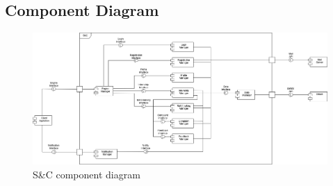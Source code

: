 \subsection{Component Diagram}
\label{sec:component_diagram}
\begin{figure}[H]
    \centering
    \includegraphics[width=1\linewidth]{Images/Component diagrams/ComponentDiagram.png}
    \caption{S\&C component diagram }
    \label{fig:enter-label}
\end{figure}

